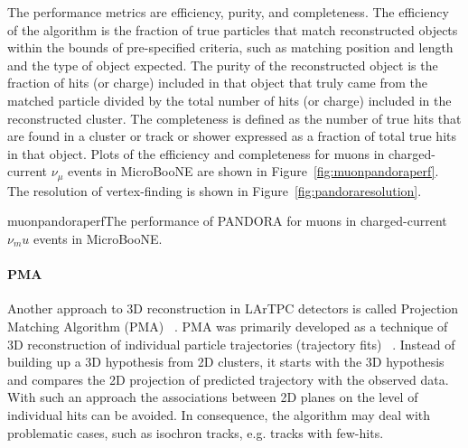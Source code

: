 The performance metrics are efficiency, purity, and completeness.  The
efficiency of the algorithm is the fraction of true particles that
match reconstructed objects within the bounds of pre-specified
criteria, such as matching position and length and the type of object
expected.  The purity of the reconstructed object is the fraction of
hits (or charge) included in that object that truly came from the
matched particle divided by the total number of hits (or charge)
included in the reconstructed cluster.  The completeness is defined as
the number of true hits that are found in a cluster or track or shower
expressed as a fraction of total true hits in that object.  Plots of
the efficiency and completeness for muons in charged-current $\nu_{\mu}$
events in MicroBooNE are shown in Figure~\ref{fig:muonpandoraperf}.
The resolution of vertex-finding is shown in
Figure~\ref{fig:pandoraresolution}.

\begin{cdrfigure}{muonpandoraperf}{The performance of PANDORA for muons in charged-current
  $\nu_mu$ events in MicroBooNE. }
\end{cdrfigure}


\paragraph{PMA}
Another approach to 3D reconstruction in LArTPC detectors is called Projection Matching Algorithm
(PMA) ~\cite{pma_algorithm}. PMA was primarily developed as a technique of 3D reconstruction
of individual particle trajectories (trajectory fits) ~\cite{icarus3dreco}. Instead of
building up a 3D hypothesis from 2D clusters, it starts with the 3D hypothesis and compares
the 2D projection of predicted trajectory with the observed data. With such an approach
the associations between 2D planes on the level of individual hits can be avoided.
In consequence, the algorithm may deal with problematic cases, such as isochron tracks,
e.g. tracks with few-hits.

